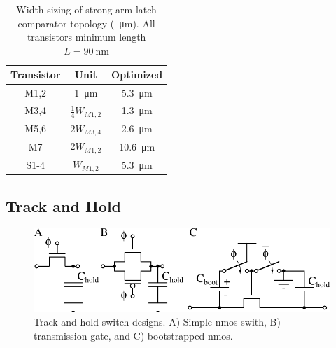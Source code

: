\documentclass[10pt,journal]{IEEEtran}\usepackage{longtable}
\newcommand{\rowstyle}[1]{\gdef\currentrowstyle{#1}%
  #1\ignorespaces
}
\begin{document}
\begin{table}[h]
\caption{Width sizing of strong arm latch comparator topology (\SI{}{\micro\metre}). All transistors minimum length $L=\SI{90}{\nano\metre}$}
\begin{center}
\begin{tabular}{c|c|c}
\hline \rowstyle{\bfseries} Transistor & \rowstyle{\bfseries} Unit & \rowstyle{\bfseries}  Optimized \\ \hline
M1,2 & \SI{1}{\micro\metre} & \SI{5.3}{\micro\metre} \\ \hline
M3,4 & $\frac{1}{4} W_{M1,2}$ & \SI{1.3}{\micro\metre}  \\ \hline
M5,6 & $2W_{M3,4}$ & \SI{2.6}{\micro\metre}\\ \hline
M7 & $2W_{M1,2}$ & \SI{10.6}{\micro\metre} \\ \hline
S1-4 & $W_{M1,2}$ & \SI{5.3}{\micro\metre}  \\ \hline
\end{tabular}
\end{center}
\label{tbl:ComparatorDesign}
\end{table}



\subsection{Track and Hold}
\begin{figure}[tbph]
\begin{center}
\includegraphics[width=1\columnwidth]{Switch_types.pdf}
\caption{Track and hold switch designs. A) Simple nmos swith, B) transmission gate, and C) bootstrapped nmos.}
\label{fig:SwitchTypes}
\end{center}
\end{figure}
\end{document}
